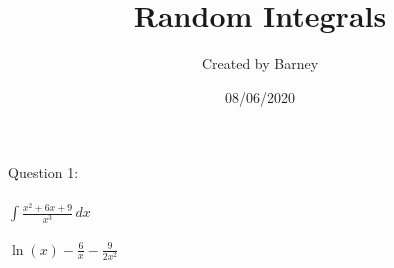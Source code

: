 \documentclass[11pt,a4paper]{article}
\title{Random Integrals}
\author{Created by Barney}
\date{08/06/2020}
\begin{document}
\begin{titlepage}
\maketitle
\end{titlepage}
Question 1:\\\\
$\int \frac{x^{2} + 6 x + 9}{x^{3}}\, dx$\\\\$\ln{\left(x \right)} - \frac{6}{x} - \frac{9}{2 x^{2}}$
\end{document}
